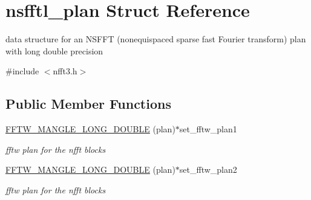 \hypertarget{structnsfftl__plan}{\section{nsfftl\-\_\-plan Struct Reference}
\label{structnsfftl__plan}
}


data structure for an N\-S\-F\-F\-T (nonequispaced sparse fast Fourier transform) plan with long double precision  




{\ttfamily \#include $<$nfft3.\-h$>$}

\subsection*{Public Member Functions}
\begin{DoxyCompactItemize}
\item 
\hypertarget{structnsfftl__plan_a9a426f13a97f82a480413cba913b7f2b}{\hyperlink{structnsfftl__plan_a9a426f13a97f82a480413cba913b7f2b}{F\-F\-T\-W\-\_\-\-M\-A\-N\-G\-L\-E\-\_\-\-L\-O\-N\-G\-\_\-\-D\-O\-U\-B\-L\-E} (plan)$\ast$set\-\_\-fftw\-\_\-plan1}\label{structnsfftl__plan_a9a426f13a97f82a480413cba913b7f2b}

\begin{DoxyCompactList}\small\item\em fftw plan for the nfft blocks \end{DoxyCompactList}\item 
\hypertarget{structnsfftl__plan_aa7137e627728ebee120141e78066da51}{\hyperlink{structnsfftl__plan_aa7137e627728ebee120141e78066da51}{F\-F\-T\-W\-\_\-\-M\-A\-N\-G\-L\-E\-\_\-\-L\-O\-N\-G\-\_\-\-D\-O\-U\-B\-L\-E} (plan)$\ast$set\-\_\-fftw\-\_\-plan2}\label{structnsfftl__plan_aa7137e627728ebee120141e78066da51}

\begin{DoxyCompactList}\small\item\em fftw plan for the nfft blocks \end{DoxyCompactList}\end{DoxyCompactItemize}
